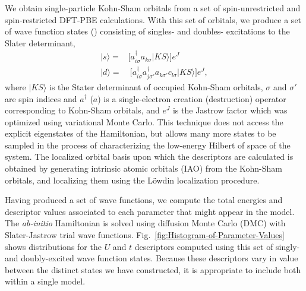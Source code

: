 We obtain single-particle Kohn-Sham orbitals from a set of spin-unrestricted and spin-restricted DFT-PBE calculations. With this set of orbitals, we produce a set of wave function states () consisting of singles- and doubles- excitations to the Slater determinant, %
\begin{subequations}
\begin{eqnarray}
| s \rangle = & \Big[a^\dagger_{i \sigma} a_{k \sigma}   | KS \rangle \Big]e^J \\
| d \rangle = & \: \Big[a^\dagger_{i \sigma} a^\dagger_{j \sigma'} a_{k \sigma'} c_{l \sigma}   | KS \rangle\Big]e^J ,
\end{eqnarray}
\end{subequations}
where $|KS\rangle$ is the Stater determinant of occupied Kohn-Sham orbitals, $\sigma$ and $\sigma'$ are spin indices and $a^\dagger$ ($a$) is a single-electron creation (destruction) operator corresponding to Kohn-Sham orbitals, and $e^J$ is the Jastrow factor which was optimized using variational Monte Carlo. This technique does not access the explicit eigenstates of the Hamiltonian, but allows many more states to be sampled in the process of characterizing the low-energy Hilbert of space of the system. The localized orbital basis upon which the descriptors are calculated is obtained by generating intrinsic atomic orbitals (IAO) from the Kohn-Sham orbitals, and localizing them using the L\"owdin localization procedure. 

Having produced a set of wave functions, we compute the total energies and descriptor values associated to each parameter that might appear in the model. The \textit{ab-initio} Hamiltonian is solved using diffusion Monte Carlo (DMC) with Slater-Jastrow trial wave functions. Fig.~\ref{fig:Histogram-of-Parameter-Values} shows distributions for the $U$ and $t$ descriptors computed using this set of singly- and doubly-excited wave function states.  Because these descriptors vary in value between the distinct states we have constructed, it is appropriate to include both within a single model.

